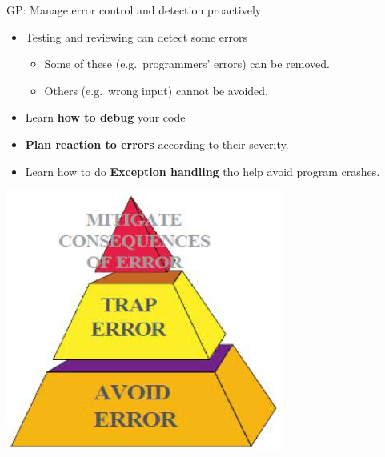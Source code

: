 \documentclass[ignorenonframetext,]{beamer}
\providecommand{\tightlist}{%
  \setlength{\itemsep}{0pt}\setlength{\parskip}{0pt}}
\begin{document}
\begin{frame}{%
\protect\hypertarget{gp-manage-error-control-and-detection-proactively}{%
GP: Manage error control and detection proactively}}

\begin{itemize}
\tightlist
\item
  Testing and reviewing can detect some errors

  \begin{itemize}
  \tightlist
  \item
    Some of these (e.g.~programmers’ errors) can be removed.
  \item
    Others (e.g.~wrong input) cannot be avoided.
  \end{itemize}
\item
  Learn \textbf{how to debug} your code
\item
  \textbf{Plan reaction to errors} according to their severity.
\item
  Learn how to do \textbf{Exception handling} tho help avoid program
  crashes.
\end{itemize}

\begin{center}
\includegraphics[height=0.3\textheight]{"images/errorHandling"}
\end{center}

\end{frame}
\end{document}
